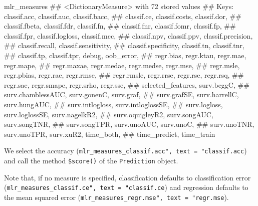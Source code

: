 \documentclass[
  11pt,
  parskip=half,
  DIV=calc,
  BCOR=10mm,
  x11names]{scrbook}
\newenvironment{Shaded}{}{}
\newcommand{\KeywordTok}[1]{\textcolor[rgb]{0.00,0.00,1.00}{#1}}
\newcommand{\NormalTok}[1]{#1}
\newcommand{\OperatorTok}[1]{#1}
\newcommand{\StringTok}[1]{\textcolor[rgb]{0.00,0.50,0.50}{#1}}
\begin{document}
\begin{Shaded}
\begin{Highlighting}[]
\NormalTok{mlr_measures}
\NormalTok{## <DictionaryMeasure> with 72 stored values}
\NormalTok{## Keys: classif.acc, classif.auc, classif.bacc,}
\NormalTok{##   classif.ce, classif.costs, classif.dor,}
\NormalTok{##   classif.fbeta, classif.fdr, classif.fn,}
\NormalTok{##   classif.fnr, classif.fomr, classif.fp,}
\NormalTok{##   classif.fpr, classif.logloss, classif.mcc,}
\NormalTok{##   classif.npv, classif.ppv, classif.precision,}
\NormalTok{##   classif.recall, classif.sensitivity,}
\NormalTok{##   classif.specificity, classif.tn, classif.tnr,}
\NormalTok{##   classif.tp, classif.tpr, debug, oob_error,}
\NormalTok{##   regr.bias, regr.ktau, regr.mae, regr.mape,}
\NormalTok{##   regr.maxae, regr.medae, regr.medse, regr.mse,}
\NormalTok{##   regr.msle, regr.pbias, regr.rae, regr.rmse,}
\NormalTok{##   regr.rmsle, regr.rrse, regr.rse, regr.rsq,}
\NormalTok{##   regr.sae, regr.smape, regr.srho, regr.sse,}
\NormalTok{##   selected_features, surv.beggC,}
\NormalTok{##   surv.chamblessAUC, surv.gonenC, surv.graf,}
\NormalTok{##   surv.grafSE, surv.harrellC, surv.hungAUC,}
\NormalTok{##   surv.intlogloss, surv.intloglossSE,}
\NormalTok{##   surv.logloss, surv.loglossSE, surv.nagelkR2,}
\NormalTok{##   surv.oquigleyR2, surv.songAUC, surv.songTNR,}
\NormalTok{##   surv.songTPR, surv.unoAUC, surv.unoC,}
\NormalTok{##   surv.unoTNR, surv.unoTPR, surv.xuR2, time_both,}
\NormalTok{##   time_predict, time_train}
\end{Highlighting}
\end{Shaded}

We select the accuracy (\texttt{mlr\_measures\_classif.acc",\ text\ =\ "classif.acc}) and call the method \texttt{\$score()} of the \texttt{Prediction} object.

\begin{Shaded}
\end{Shaded}

Note that, if no measure is specified, classification defaults to classification error (\texttt{mlr\_measures\_classif.ce",\ text\ =\ "classif.ce}) and regression defaults to the mean squared error (\texttt{mlr\_measures\_regr.mse",\ text\ =\ "regr.mse}).
\end{document}
